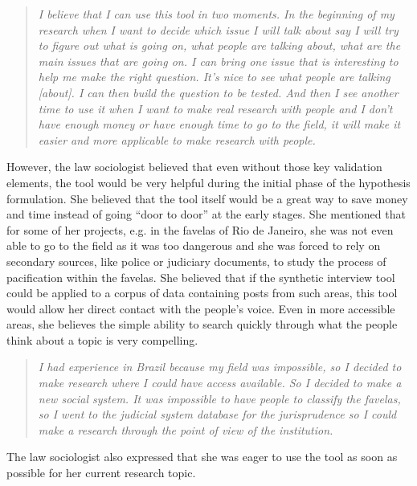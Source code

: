 \documentclass{sigchi}
\begin{document}
\begin{quote}
{\em
I believe that I can use this tool in two moments. In the beginning of my research when I want to decide which issue I will talk about say I will try to figure out what is going on, what people are talking about, what are the main issues that are going on. I can bring one issue that is interesting to help me make the right question. It's nice to see what people are talking [about]. I can then build the question to be tested. And then I see another time to use it when I want to make real research with people and I don't have enough money or have enough time to go to the field, it will make it easier and more applicable to make research with people. 
}\end{quote}

However, the law sociologist believed that even without those key validation elements, the tool would be very helpful during the initial phase of the hypothesis formulation. She believed that the tool itself would be a great way to save money and time instead of going ``door to door'' at the early stages. She mentioned that for some of her projects, e.g. in the favelas of Rio de Janeiro, she was not even able to go to the field as it was too dangerous and she was forced to rely on secondary sources, like police or judiciary documents, to study the process of pacification within the favelas. She believed that if the synthetic interview tool could be applied to a corpus of data containing posts from such areas, this tool would allow her direct contact with the people's voice. Even in more accessible areas, she believes the simple ability to search quickly through what the people think about a topic is very compelling. 

\begin{quote}
{\em
I had experience in Brazil because my field was impossible, so I decided to make research where I could have access available. So I decided to make a new social system. It was impossible to have people to classify the favelas, so I went to the judicial system database for the jurisprudence so I could make a research through the point of view of the institution.
}\end{quote}

The law sociologist also expressed that she was eager to use the tool as soon as possible for her current research topic.

\end{document}
